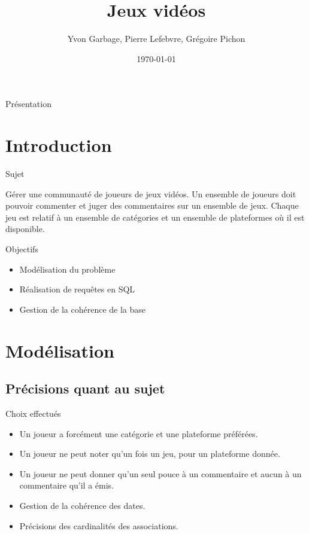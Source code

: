 \documentclass{beamer}
\title[Projet de SGBD]{Jeux vidéos}
\author[Les Manchots]{Yvon Garbage, Pierre Lefebvre, Grégoire Pichon}
\institute[ENSEIRB-MATMECA]{ENSEIRB-MATMECA}
\date{\today}
\begin{document}
\setlength{\unitlength}{1cm}

\begin{frame}{Présentation}

\titlepage

\end{frame}

\section*{Introduction}
\begin{frame}
\begin{block}{Sujet}
\begin{center}
Gérer une communauté de joueurs de jeux vidéos. Un ensemble de joueurs doit pouvoir commenter et juger des commentaires sur un ensemble de jeux. Chaque jeu est relatif à un ensemble de catégories et un ensemble de plateformes où il est disponible.
\end{center}
\end{block}

\begin{block}{Objectifs}
\begin{center}
\begin{itemize}
  \item{Modélisation du problème}
  \item{Réalisation de requêtes en SQL}
  \item{Gestion de la cohérence de la base}
\end{itemize}
\end{center}
\end{block}
\end{frame}

\section{Modélisation}
\subsection{Précisions quant au sujet}
\begin{frame}
\begin{block}{Choix effectués}
\begin{center}
\begin{itemize}
\item Un joueur a forcément une catégorie et une plateforme préférées.
\item Un joueur ne peut noter qu'un fois un jeu, pour un plateforme donnée.
\item Un joueur ne peut donner qu'un seul pouce à un commentaire et aucun à un commentaire qu'il a émis.
\item Gestion de la cohérence des dates.
\item Précisions des cardinalités des associations.
\end{itemize}
\end{center}
\end{block}
\end{frame}
\end{document}
